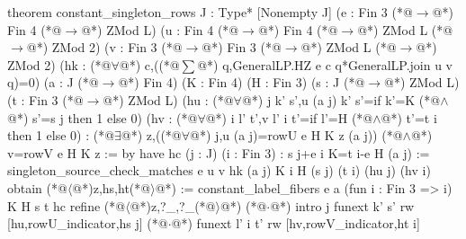 theorem constant_singleton_rows {J : Type*} [Nonempty J]
    (e : Fin 3 (*@$\to$@*) Fin 4 (*@$\to$@*) ZMod L)
    (u : Fin 4 (*@$\to$@*) Fin 4 (*@$\to$@*) ZMod L (*@$\to$@*) ZMod 2)
    (v : Fin 3 (*@$\to$@*) Fin 3 (*@$\to$@*) ZMod L (*@$\to$@*) ZMod 2)
    (hk : (*@$\forall$@*) c,((*@$\sum$@*) q,GeneralLP.HZ e c q*GeneralLP.join u v q)=0)
    (a : J (*@$\to$@*) Fin 4) (K : Fin 4) (H : Fin 3)
    (s : J (*@$\to$@*) ZMod L) (t : Fin 3 (*@$\to$@*) ZMod L)
    (hu : (*@$\forall$@*) j k' s',u (a j) k' s'=if k'=K (*@$\land$@*) s'=s j then 1 else 0)
    (hv : (*@$\forall$@*) i l' t',v l' i t'=if l'=H (*@$\land$@*) t'=t i then 1 else 0) :
    (*@$\exists$@*) z,((*@$\forall$@*) j,u (a j)=rowU e H K z (a j)) (*@$\land$@*) v=rowV e H K z := by
  have hc (j : J) (i : Fin 3) : s j+e i K=t i-e H (a j) :=
    singleton_source_check_matches e u v hk (a j) K i H (s j) (t i) (hu j) (hv i)
  obtain (*@$\langle$@*)z,hs,ht(*@$\rangle$@*) := constant_label_fibers e a (fun i : Fin 3 => i) K H s t hc
  refine (*@$\langle$@*)z,?_,?_(*@$\rangle$@*)
  (*@$\cdot$@*) intro j
    funext k' s'
    rw [hu,rowU_indicator,hs j]
  (*@$\cdot$@*) funext l' i t'
    rw [hv,rowV_indicator,ht i]
